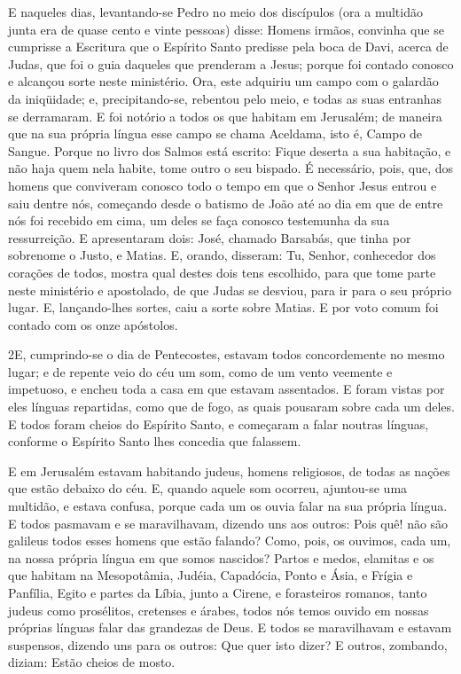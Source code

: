 E naqueles dias, levantando-se Pedro no meio dos discípulos (ora
a multidão junta era de quase cento e vinte pessoas) disse:
Homens irmãos, convinha que se cumprisse a Escritura que o
Espírito Santo predisse pela boca de Davi, acerca de Judas, que foi
o guia daqueles que prenderam a Jesus; porque foi contado
conosco e alcançou sorte neste ministério. Ora, este adquiriu
um campo com o galardão da iniqüidade; e, precipitando-se, rebentou
pelo meio, e todas as suas entranhas se derramaram. E foi
notório a todos os que habitam em Jerusalém; de maneira que na sua
própria língua esse campo se chama Aceldama, isto é, Campo de
Sangue. Porque no livro dos Salmos está escrito: Fique
deserta a sua habitação, e não haja quem nela habite, tome outro o
seu bispado. É necessário, pois, que, dos homens que
conviveram conosco todo o tempo em que o Senhor Jesus entrou e saiu
dentre nós, começando desde o batismo de João até ao dia em
que de entre nós foi recebido em cima, um deles se faça conosco
testemunha da sua ressurreição. E apresentaram dois: José,
chamado Barsabás, que tinha por sobrenome o Justo, e Matias.
E, orando, disseram: Tu, Senhor, conhecedor dos corações de
todos, mostra qual destes dois tens escolhido, para que tome
parte neste ministério e apostolado, de que Judas se desviou, para
ir para o seu próprio lugar. E, lançando-lhes sortes, caiu a
sorte sobre Matias. E por voto comum foi contado com os onze
apóstolos.

\medskip

\lettrine{2} E, cumprindo-se o dia de Pentecostes, estavam
todos concordemente no mesmo lugar; e de repente veio do céu um
som, como de um vento veemente e impetuoso, e encheu toda a casa em
que estavam assentados. E foram vistas por eles línguas
repartidas, como que de fogo, as quais pousaram sobre cada um deles.
E todos foram cheios do Espírito Santo, e começaram a falar
noutras línguas, conforme o Espírito Santo lhes concedia que
falassem.

E em Jerusalém estavam habitando judeus, homens religiosos, de
todas as nações que estão debaixo do céu. E, quando aquele som
ocorreu, ajuntou-se uma multidão, e estava confusa, porque cada um
os ouvia falar na sua própria língua. E todos pasmavam e se
maravilhavam, dizendo uns aos outros: Pois quê! não são galileus
todos esses homens que estão falando? Como, pois, os ouvimos,
cada um, na nossa própria língua em que somos nascidos? Partos e
medos, elamitas e os que habitam na Mesopotâmia, Judéia, Capadócia,
Ponto e Ásia, e Frígia e Panfília, Egito e partes da Líbia,
junto a Cirene, e forasteiros romanos, tanto judeus como prosélitos,
cretenses e árabes, todos nós temos ouvido em nossas próprias
línguas falar das grandezas de Deus. E todos se maravilhavam
e estavam suspensos, dizendo uns para os outros: Que quer isto
dizer? E outros, zombando, diziam: Estão cheios de mosto.

